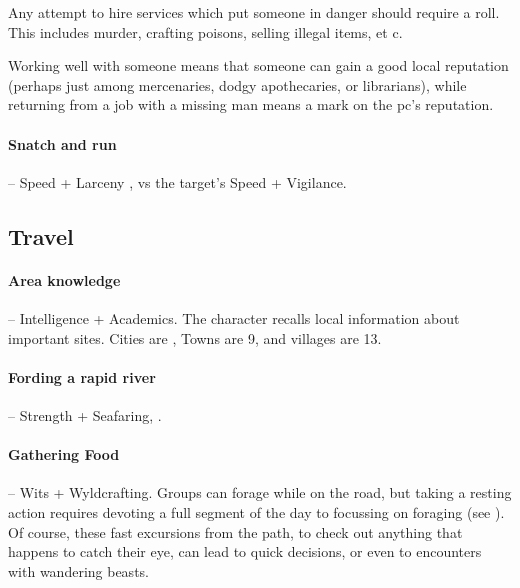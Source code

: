 \begin{multicols}{2}
Any attempt to hire services which put someone in danger should require a roll.
This includes murder, crafting poisons, selling illegal items, et c.

Working well with someone means that someone can gain a good local reputation (perhaps just among mercenaries, dodgy apothecaries, or librarians), while returning from a job with a missing man means a mark on the \gls{pc}'s reputation.

\paragraph{Snatch and run} -- Speed + Larceny , vs the target's Speed + Vigilance.

\subsection{Travel}

\paragraph{Area knowledge } -- Intelligence + Academics.
The character recalls local information about important sites.
Cities are , Towns are 9, and villages are 13.

\paragraph{Fording a rapid river} -- Strength + Seafaring, .

\paragraph{Gathering Food} -- Wits + Wyldcrafting.
Groups can forage while on the road, but taking a resting action requires devoting a full segment of the day to focussing on foraging (see ).
Of course, these fast excursions from the path, to check out anything that happens to catch their eye, can lead to quick decisions, or even to encounters with wandering beasts.


\end{multicols}
